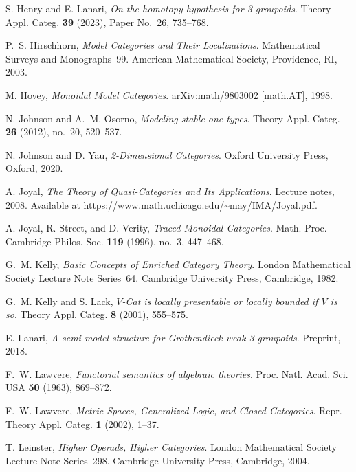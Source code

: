 \documentclass{tac}
\begin{document}
\begin{references*}
S. Henry and E. Lanari,
\emph{On the homotopy hypothesis for 3-groupoids}.
Theory Appl. Categ. \textbf{39} (2023), Paper No.~26, 735--768.

P.~S. Hirschhorn,
\emph{Model Categories and Their Localizations}.
Mathematical Surveys and Monographs~99.
American Mathematical Society, Providence, RI, 2003.

M. Hovey,
\emph{Monoidal Model Categories}.
arXiv:math/9803002 [math.AT], 1998.

N. Johnson and A.~M. Osorno,
\emph{Modeling stable one-types}.
Theory Appl. Categ. \textbf{26} (2012), no.~20, 520--537.

N. Johnson and D. Yau,
\emph{2-Dimensional Categories}.
Oxford University Press, Oxford, 2020.

A. Joyal,
\emph{The Theory of Quasi-Categories and Its Applications}.
Lecture notes, 2008.
Available at \url{https://www.math.uchicago.edu/~may/IMA/Joyal.pdf}.

A. Joyal, R. Street, and D. Verity,
\emph{Traced Monoidal Categories}.
Math. Proc. Cambridge Philos. Soc. \textbf{119} (1996), no.~3, 447--468.

G.~M. Kelly,
\emph{Basic Concepts of Enriched Category Theory}.
London Mathematical Society Lecture Note Series~64.
Cambridge University Press, Cambridge, 1982.

G.~M. Kelly and S. Lack,
\emph{$V$-Cat is locally presentable or locally bounded if $V$ is so}.
Theory Appl. Categ. \textbf{8} (2001), 555--575.

E. Lanari,
\emph{A semi-model structure for Grothendieck weak 3-groupoids}.
Preprint, 2018.

F.~W. Lawvere,
\emph{Functorial semantics of algebraic theories}.
Proc. Natl. Acad. Sci. USA \textbf{50} (1963), 869--872.

F.~W. Lawvere,
\emph{Metric Spaces, Generalized Logic, and Closed Categories}.
Repr. Theory Appl. Categ. \textbf{1} (2002), 1--37.

T. Leinster,
\emph{Higher Operads, Higher Categories}.
London Mathematical Society Lecture Note Series~298.
Cambridge University Press, Cambridge, 2004.


\end{references*}
\end{document}
